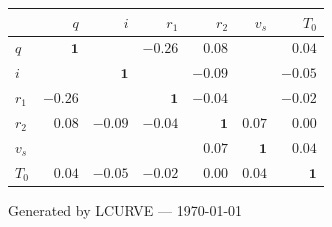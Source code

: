 \documentclass[11pt,a4paper]{article}
\newcommand{\thead}[1]{\textbf{\color{headerfg}#1}}
\begin{document}
{\small
\setlength{\tabcolsep}{4pt}
\begin{tabular}{lrrrrrr}
\toprule
\rowcolor{headerblue} \thead{} & \thead{$q$} & \thead{$i$} & \thead{$r_1$} & \thead{$r_2$} & \thead{$v_s$} & \thead{$T_0$} \\
\midrule
\rowcolor{rowA}$q$ & \cellcolor{accentblue!15}$\mathbf{1}$ & \cellcolor{red!20}{\color{red!70!black}$-0.76$} & {\color{black}$-0.26$} & {\color{black}$0.08$} & \cellcolor{yellow!20}{\color{orange!80!black}$0.40$} & {\color{black}$0.04$} \\
\rowcolor{rowB}$i$ & \cellcolor{red!20}{\color{red!70!black}$-0.76$} & \cellcolor{accentblue!15}$\mathbf{1}$ & \cellcolor{yellow!20}{\color{orange!80!black}$0.47$} & {\color{black}$-0.09$} & \cellcolor{red!20}{\color{red!70!black}$-0.81$} & {\color{black}$-0.05$} \\
\rowcolor{rowA}$r_1$ & {\color{black}$-0.26$} & \cellcolor{yellow!20}{\color{orange!80!black}$0.47$} & \cellcolor{accentblue!15}$\mathbf{1}$ & {\color{black}$-0.04$} & \cellcolor{yellow!20}{\color{orange!80!black}$-0.56$} & {\color{black}$-0.02$} \\
\rowcolor{rowB}$r_2$ & {\color{black}$0.08$} & {\color{black}$-0.09$} & {\color{black}$-0.04$} & \cellcolor{accentblue!15}$\mathbf{1}$ & {\color{black}$0.07$} & {\color{black}$0.00$} \\
\rowcolor{rowA}$v_s$ & \cellcolor{yellow!20}{\color{orange!80!black}$0.40$} & \cellcolor{red!20}{\color{red!70!black}$-0.81$} & \cellcolor{yellow!20}{\color{orange!80!black}$-0.56$} & {\color{black}$0.07$} & \cellcolor{accentblue!15}$\mathbf{1}$ & {\color{black}$0.04$} \\
\rowcolor{rowB}$T_0$ & {\color{black}$0.04$} & {\color{black}$-0.05$} & {\color{black}$-0.02$} & {\color{black}$0.00$} & {\color{black}$0.04$} & \cellcolor{accentblue!15}$\mathbf{1}$ \\
\bottomrule
\end{tabular}
}

\vfill
\begin{center}
{\small\color{gray} Generated by \textsc{LCURVE} --- \today}
\end{center}
\end{document}
